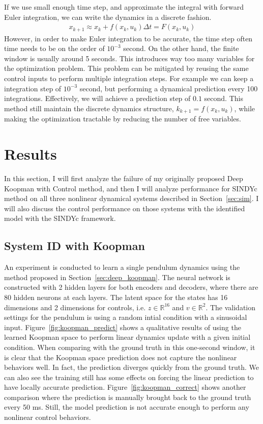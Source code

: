 \documentclass[10pt,twocolumn]{article}
\begin{document}
If we use small enough time step, and approximate the integral with forward Euler integration,
we can write the dynamics in a discrete fashion.
\begin{gather}
  x_{k+1} \approx x_k + f(x_k, u_k) \Delta t = F(x_k, u_k)
\end{gather}
However, in order to make Euler integration to be accurate, the time step often time needs to be
on the order of $10^{-3}$ second. On the other hand, the finite window is usually around 5 seconds.
This introduces way too many variables for the optimization problem. This problem can be
mitigated by reusing the same control inputs to perform multiple integration steps. For example
we can keep a integration step of $10^{-3}$ second, but performing a dynamical prediction
every 100 integrations. Effectively, we will achieve a prediction step of $0.1$ second. This
method still maintain the discrete dynamics structure, $k_{k+1} = f(x_k, u_k)$, while making
the optimization tractable by reducing the number of free variables.

\section{Results}

In this section, I will first analyze the failure of my originally proposed Deep Koopman with
Control method, and then I will analyze performance for SINDYc method
on all three nonlinear dynamical systems described in Section~\ref{sec:sim}. I will also discuss
the control performance on those systems with the identified model with the SINDYc framework.

\subsection{System ID with Koopman}


An experiment is conducted to learn a single pendulum dynamics using the method proposed
in Section~\ref{sec:deep_koopman}. The neural network is constructed with 2 hidden layers
for both encoders and decoders, where there are 80 hidden neurons at each layers. The
latent space for the states has 16 dimensions and 2 dimensions for controls, i.e.
$z \in \mathbb{R}^{16}$ and $v \in \mathbb{R}^2$. The validation settings for the pendulum
is using a random intial condition with a sinusoidal input. Figure~\ref{fig:koopman_predict}
shows a qualitative results of using the learned Koopman space to perform linear dynamics update
with a given initial condition. When comparing with the ground truth in this one-second window,
it is clear that the
Koopman space prediction does not capture the nonlinear behaviors well. In fact, the prediction
diverges quickly from the ground truth. We can also see the training still has some effects
on forcing the linear prediction to have locally accurate prediction.
Figure~\ref{fig:koopman_correct} shows another comparison where the prediction is manually
brought back to the ground truth every 50 ms. Still, the model prediction is not accurate enough
to perform any nonlinear control behaviors.
\end{document}
